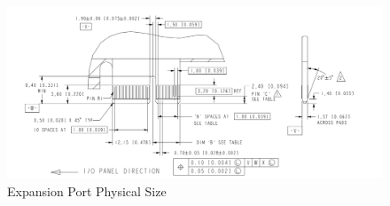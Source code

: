 \begin{figure}[ht]
    \begin{center}
        \includegraphics[width=6in]{images/pci.png}
    \end{center}
    \caption{Expansion Port Physical Size}
    \label{fig:port_expan_size}
\end{figure}


